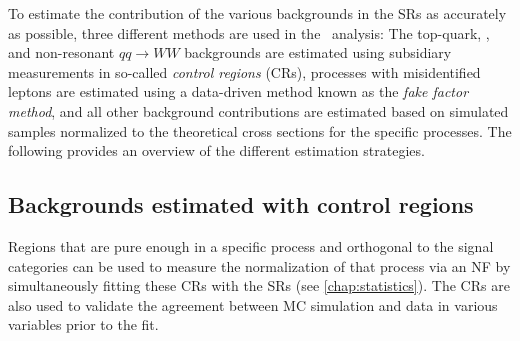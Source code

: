To estimate the contribution of the various backgrounds in the SRs as accurately as possible, three different methods are used in the \HWW\ analysis:
The top-quark, \Zgamma, and non-resonant $qq \to WW$ backgrounds are estimated using subsidiary measurements in so-called \emph{control regions} (CRs), processes with misidentified leptons are estimated using a data-driven method known as the \emph{fake factor method}, and all other background contributions are estimated based on simulated samples normalized to the theoretical cross sections for the specific processes.
The following provides an overview of the different estimation strategies.

\subsection{Backgrounds estimated with control regions}
Regions that are pure enough in a specific process and orthogonal to the signal categories can be used to measure the normalization of that process via an NF by simultaneously fitting these CRs with the SRs (see \cref{chap:statistics}).
The CRs are also used to validate the agreement between MC simulation and data in various variables prior to the fit.

